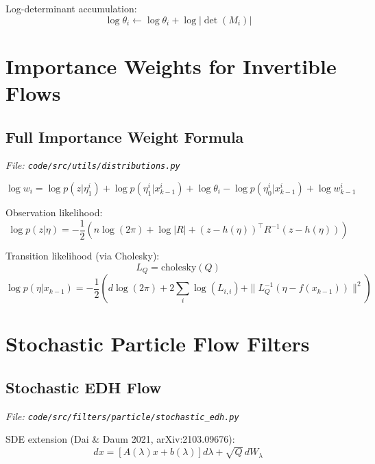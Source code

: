 \documentclass[12pt]{article}
\begin{document}
Log-determinant accumulation:
\begin{equation}
\log\theta_i \leftarrow \log\theta_i + \log|\det(M_i)|
\end{equation}

\section{Importance Weights for Invertible Flows}

\subsection{Full Importance Weight Formula}
\textit{File: \texttt{code/src/utils/distributions.py}}

\begin{equation}
\log w_i = \log p(z | \eta_1^i) + \log p(\eta_1^i | x_{k-1}^i) + \log\theta_i - \log p(\eta_0^i | x_{k-1}^i) + \log w_{k-1}^i
\end{equation}

Observation likelihood:
\begin{equation}
\log p(z | \eta) = -\frac{1}{2} (n\log(2\pi) + \log|R| + (z - h(\eta))^\top R^{-1} (z - h(\eta)))
\end{equation}

Transition likelihood (via Cholesky):
\begin{equation}
L_Q = \text{cholesky}(Q)
\end{equation}
\begin{equation}
\log p(\eta | x_{k-1}) = -\frac{1}{2} (d\log(2\pi) + 2\sum_i \log(L_{i,i}) + \|L_Q^{-1}(\eta - f(x_{k-1}))\|^2)
\end{equation}

\section{Stochastic Particle Flow Filters}

\subsection{Stochastic EDH Flow}
\textit{File: \texttt{code/src/filters/particle/stochastic\_edh.py}}

SDE extension (Dai \& Daum 2021, arXiv:2103.09676):
\begin{equation}
dx = [A(\lambda) x + b(\lambda)] d\lambda + \sqrt{Q} \, dW_\lambda
\end{equation}
\end{document}
